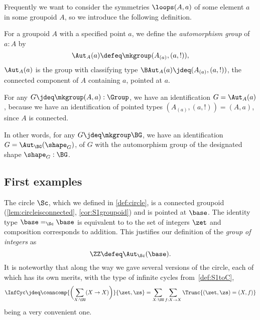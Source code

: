 Frequently we want to consider the symmetries $\loops(A,a)$ of some element $a$ in some groupoid $A$, so we introduce the following definition.

\begin{definition}\label{def:automorphism-group}
  For a groupoid $A$ with a specified point $a$,
  we define the \emph{automorphism group} of $a:A$ by
  \[
    \Aut_A(a) \defeq \mkgroup (A_{(a)},(a,!)),
  \]
  \ie $\Aut_A(a)$ is the group with classifying type
  $\BAut_A(a) \jdeq (A_{(a)},(a,!))$,
  the connected component of $A$ containing $a$, pointed at $a$.
\end{definition}
\begin{remark}
  \label{rem:symmetriesofnonconnectedgroupoids}
  For any $G \jdeq \mkgroup(A,a) : \Group$, we have an identification
  $G = \Aut_A(a)$,
  because we have an identification of pointed types $(A_{(a)},(a,!)) = (A,a)$,
  since $A$ is connected.

  In other words, for any $G \jdeq \mkgroup\BG$, we have
  an identification $G = \Aut_{\BG}(\shape_G)$, of $G$ with the automorphism
  group of the designated shape $\shape_G : \BG$.
\end{remark}

\subsection{First examples}
\label{sec:firstgroupexamples}
\begin{example}\label{ex:circlegroup}
  The circle $\Sc$, which we defined in \cref{def:circle},
  is a connected groupoid (\cref{lem:circleisconnected}, \cref{cor:S1groupoid})
  and is pointed at $\base$.
  The identity type $\base=_\Sc\base$ is equivalent to to the set of integers $\zet$
  and composition corresponds to addition.
  This justifies our definition of the \emph{group of integers} as
  \[
    \ZZ \defeq \Aut_\Sc(\base).
  \]
  It is noteworthy that along the way we gave several versions of the circle,
  each of which has its own merits,
  with the type of infinite cycles from~\cref{def:S1toC},
  \[
    \InfCyc\jdeq\conncomp{\biggl(\sum_{X:\UU}(X\to X)\biggr)}{\zet,\zs}
    = \sum_{X:\UU} \sum_{f:X\to X} \Trunc{(\zet,\zs)=(X,f)}
  \]
  being a very convenient one.
\end{example}

